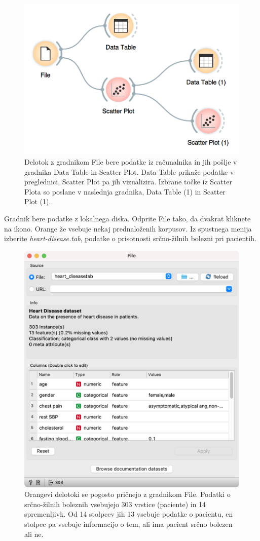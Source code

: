 \begin{figure}[h]
  \centering
  \includegraphics[width=0.9\linewidth]{workflow-fig2.png}%
  \caption{Delotok z gradnikom File bere podatke iz računalnika in jih pošlje v gradnika Data Table in Scatter Plot. Data Table prikaže podatke v preglednici, Scatter Plot pa jih vizualizira. Izbrane točke iz Scatter Plota so poslane v naslednja gradnika, Data Table (1) in Scatter Plot (1).}
  \label{fig:workflow-fig2}
\end{figure}

Gradnik  bere podatke z lokalnega diska. Odprite File tako, da dvakrat kliknete na ikono. Orange že vsebuje nekaj prednaloženih korpusov. Iz spustnega menija izberite \textit{heart-disease.tab}, podatke o prisotnosti srčno-žilnih bolezni pri pacientih.

\begin{figure}[h]
  \centering
  \includegraphics[width=0.8\linewidth]{heart-disease.png}%
  \caption{Orangevi delotoki se pogosto pričnejo z gradnikom File. Podatki o srčno-žilnih boleznih vsebujejo 303 vrstice (paciente) in 14 spremenljivk.  Od 14 stolpcev jih 13 vsebuje podatke o pacientu, en stolpec pa vsebuje informacijo o tem, ali ima pacient srčno bolezen ali ne.}
  \label{fig:heart-disease}
\end{figure}

